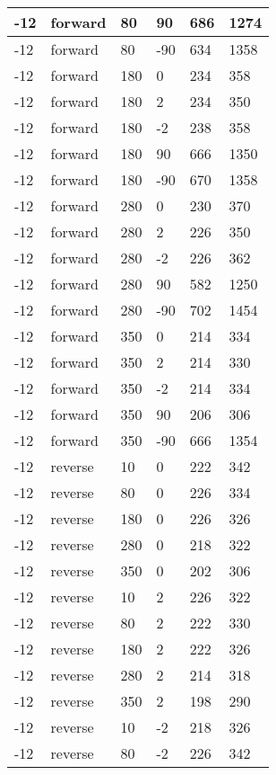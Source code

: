 \begin{longtable}{|l|l|l|l|l|l|}
			-12 & forward & 80 & 90 & 686 & 1274 \\
			\hline
			-12 & forward & 80 & -90 & 634 & 1358 \\
			\hline
			-12 & forward & 180 & 0 & 234 & 358 \\
			\hline
			-12 & forward & 180 & 2 & 234 & 350 \\
			\hline
			-12 & forward & 180 & -2 & 238 & 358 \\
			\hline
			-12 & forward & 180 & 90 & 666 & 1350 \\
			\hline
			-12 & forward & 180 & -90 & 670 & 1358 \\
			\hline
			-12 & forward & 280 & 0 & 230 & 370 \\
			\hline
			-12 & forward & 280 & 2 & 226 & 350 \\
			\hline
			-12 & forward & 280 & -2 & 226 & 362 \\
			\hline
			-12 & forward & 280 & 90 & 582 & 1250 \\
			\hline
			-12 & forward & 280 & -90 & 702 & 1454 \\
			\hline
			-12 & forward & 350 & 0 & 214 & 334 \\
			\hline
			-12 & forward & 350 & 2 & 214 & 330 \\
			\hline
			-12 & forward & 350 & -2 & 214 & 334 \\
			\hline
			-12 & forward & 350 & 90 & 206 & 306 \\
			\hline
			-12 & forward & 350 & -90 & 666 & 1354 \\
			\hline
			-12 & reverse & 10 & 0 & 222 & 342 \\
			\hline
			-12 & reverse & 80 & 0 & 226 & 334 \\
			\hline
			-12 & reverse & 180 & 0 & 226 & 326 \\
			\hline
			-12 & reverse & 280 & 0 & 218 & 322 \\
			\hline
			-12 & reverse & 350 & 0 & 202 & 306 \\
			\hline
			-12 & reverse & 10 & 2 & 226 & 322 \\
			\hline
			-12 & reverse & 80 & 2 & 222 & 330 \\
			\hline
			-12 & reverse & 180 & 2 & 222 & 326 \\
			\hline
			-12 & reverse & 280 & 2 & 214 & 318 \\
			\hline
			-12 & reverse & 350 & 2 & 198 & 290 \\
			\hline
			-12 & reverse & 10 & -2 & 218 & 326 \\
			\hline
			-12 & reverse & 80 & -2 & 226 & 342 \\

\end{longtable}
